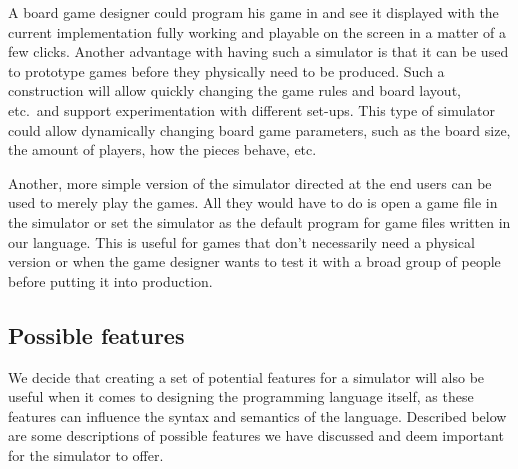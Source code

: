 A board game designer could program his game in \productname{} and see
it displayed with the current implementation fully working and playable
on the screen in a matter of a few clicks. Another advantage with having
such a simulator is that it can be used to prototype games before
they physically need to be produced. Such a construction will allow
quickly changing the game rules and board layout, etc.\ and support
experimentation with different set-ups. This type of simulator could
allow dynamically changing board game parameters, such as the board
size, the amount of players, how the pieces behave, etc.

Another, more simple version of the simulator directed at the end users
can be used to merely play the games. All they would have to do is open
a game file in the simulator or set the simulator as the default program
for game files written in our language. This is useful for games that
don't necessarily need a physical version or when the game designer
wants to test it with a broad group of people before putting it into
production.

\subsection{Possible features}
We decide that creating a set of potential features for a simulator
will also be useful when it comes to designing the programming language
itself, as these features can influence the syntax and semantics of
the \productname{} language. Described below are some descriptions of
possible features we have discussed and deem important for the simulator
to offer.

